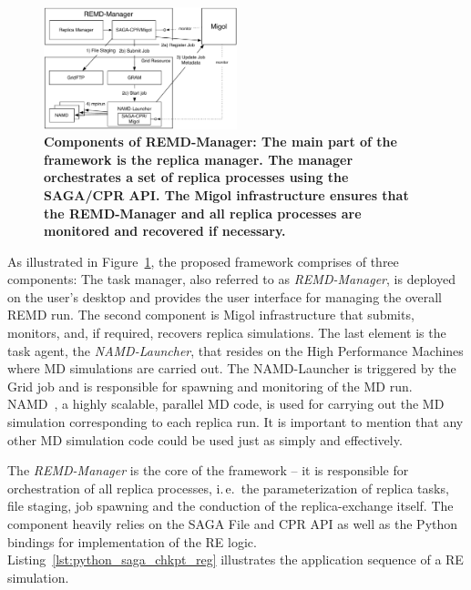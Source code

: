 \documentclass[times, 10pt, twocolumn]{article}
\newcommand{\up}{\vspace*{-1em}}
\begin{document}
\begin{figure}[ht]
      \centering
          \includegraphics[width=0.5\textwidth]{REMDgManager-architecture.pdf}
          \up\up
          \caption{\small \bf Components of REMD-Manager: The main part of the
            framework is the replica manager. The manager orchestrates
            a set of replica processes using the SAGA/CPR API. The
            Migol infrastructure ensures that the REMD-Manager and all
            replica processes are monitored and recovered if
            necessary.}
            \up\up
      \label{fig:REMD-Manager-architecture}
\end{figure}
As illustrated in Figure~\ref{fig:REMD-Manager-architecture}, the
proposed framework comprises of three components: The task manager,
also referred to as \emph{REMD-Manager}, is deployed on the user's
desktop and provides the user interface for managing the overall REMD
run. The second component is Migol infrastructure that submits,
monitors, and, if required, recovers replica simulations.  The last
element is the task agent, the \emph{NAMD-Launcher}, that resides on
the High Performance Machines where MD simulations are carried
out. The NAMD-Launcher is triggered by the Grid job and is responsible
for spawning and monitoring of the MD
run. NAMD~\cite{Phillips:2005gd}, a highly scalable, parallel MD code,
is used for carrying out the MD simulation corresponding to each
replica run. It is important to mention that any other MD simulation
code could be used just as simply and effectively.


The \emph{REMD-Manager} is the core of the framework -- it is
responsible for orchestration of all replica processes, i.\,e.\ the
parameterization of replica tasks, file staging, job spawning and the
conduction of the replica-exchange itself. The component heavily
relies on the SAGA File and CPR API as well as the Python bindings for
implementation of the RE
logic. Listing~\ref{lst:python_saga_chkpt_reg} illustrates the
application sequence of a RE simulation.
                                  
\end{document}
